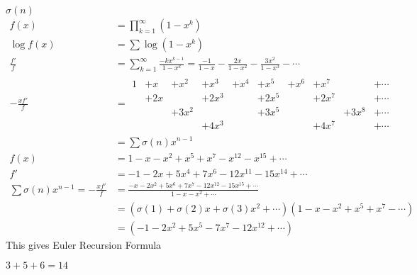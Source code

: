 $\sigma(n)$
\begin{align*}
f(x) &= \prod_{k=1}^\infty(1-x^k) \\
\log f(x) &= \sum\log(1-x^k) \\
\frac{f'}{f} &= \sum_{k=1}^\infty \frac{-kx^{k-1}}{1-x^k} = \frac{-1}{1-x} - \frac{2x}{1-x^2} - \frac{3x^2}{1-x^3} - \dotsb \\
-\frac{xf'}{f} &=
\begin{matrix}
1 &+ x &+ x^2 &+ x^3 &+ x^4 &+ x^5 &+ x^6 &+ x^7& &+\dotsb \\
  & +2x &      & +2x^3    &      & +2x^5    &      & +2x^7   & &+\dotsb \\
  &    & +3x^2    &      &      & +3x^5    &      &     &+3x^8 &+\dotsb \\
  &    &      & +4x^3    &      &      &      & +4x^7   & &+\dotsb
\end{matrix} \\
               &= \sum \sigma(n) x^{n-1} \\
f(x) &= 1 - x - x^2 + x^5 + x^7 - x^{12} - x^{15} + \dotsb \\
f' &= -1 -2x + 5x^4 + 7x^6 - 12x^{11} - 15x^{14} + \dotsb \\
\sum\sigma(n)x^{n-1} = -\frac{xf'}{f} &= \frac{-x-2x^2+5x^6+7x^7-12x^{12}-15x^{15}+\dotsb}{1-x-x^2+\dotsb} \\
&= (\sigma(1)+\sigma(2)x+\sigma(3)x^2+\dotsb)(1-x-x^2+x^5+x^7-\dotsb) \\
&= (-1-2x^2+5x^5-7x^7-12x^{12}+\dotsb)
\end{align*}
This gives Euler Recursion Formula

$3+5+6=14$ %
\begin{center}
\end{center}
